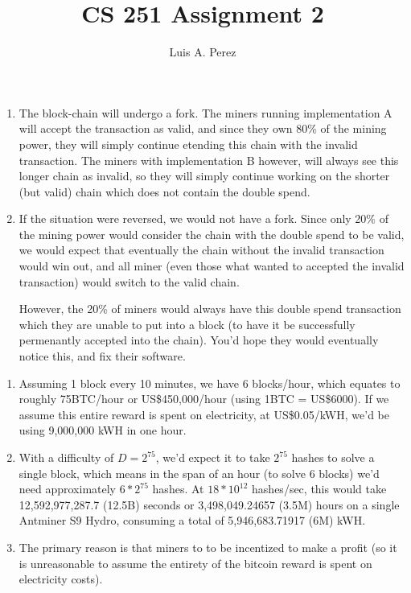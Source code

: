 \documentclass[12pt]{exam}
\newcommand*{\authorname}{Luis A. Perez}
\newcommand{\Q}[1]{\question{\large{\textbf{#1}}}}
\begin{document}
\title{CS 251 Assignment 2}
\author{\authorname}
\date{}
\maketitle
\thispagestyle{headandfoot}
\setcounter{MaxMatrixCols}{15}

\begin{questions}
\Q{Problem 1}
\begin{solution}
  \begin{enumerate}[label=\textbf{\alph*.}]
    \item The block-chain will undergo a fork. The miners running implementation A will accept the transaction as valid, and since they own 80\% of the mining power, they will simply continue etending this chain with the invalid transaction. The miners with implementation B however, will always see this longer chain as invalid, so they will simply continue working on the shorter (but valid) chain which does not contain the double spend.
    \item If the situation were reversed, we would not have a fork. Since only 20\% of the mining power would consider the chain with the double spend to be valid, we would expect that eventually the chain without the invalid transaction would win out, and all miner (even those what wanted to accepted the invalid transaction) would switch to the valid chain.

    However, the 20\% of miners would always have this double spend transaction which they are unable to put into a block (to have it be successfully permenantly accepted into the chain). You'd hope they would eventually notice this, and fix their software.
  \end{enumerate}
\end{solution}

\newpage
\Q{Problem 2}
\begin{solution}
  \begin{enumerate}[label=\textbf{\alph*.}]
    \item Assuming 1 block every 10 minutes, we have 6 blocks/hour, which equates to roughly 75BTC/hour or US\$450,000/hour (using 1BTC = US\$6000). If we assume this entire reward is spent on electricity, at US\$0.05/kWH, we'd be using 9,000,000 kWH in one hour.
    \item With a difficulty of $D = 2^{75}$, we'd expect it to take $2^{75}$ hashes to solve a single block, which means in the span of an hour (to solve 6 blocks) we'd need approximately $6*2^{75}$ hashes. At $18*10^{12}$ hashes/sec, this would take 12,592,977,287.7 (12.5B) seconds or 3,498,049.24657 (3.5M) hours on a single Antminer S9 Hydro, consuming a total of 5,946,683.71917 (6M) kWH. 
    \item The primary reason is that miners to to be incentized to make a profit (so it is unreasonable to assume the entirety of the bitcoin reward is spent on electricity costs). 
  \end{enumerate}
\end{solution}


\end{questions}
\end{document}
